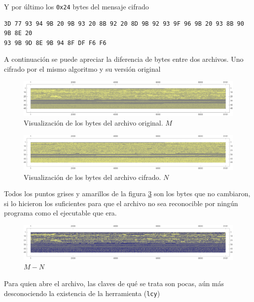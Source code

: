 \documentclass[a4paper]{article}
\begin{document}
Y por último los \texttt{0x24} bytes del mensaje cifrado

\begin{verbatim}
3D 77 93 94 9B 20 9B 93 20 8B 92 20 8D 9B 92 93 9F 96 9B 20 93 8B 90 9B 8E 20
93 9B 9D 8E 9B 94 8F DF F6 F6
\end{verbatim}

A continuación se puede apreciar la diferencia de
bytes entre dos archivos. Uno cifrado por el mismo algoritmo y su versión
original

\begin{figure}[H]
    \centering
    \includegraphics[width=\textwidth]{gr3d}
    \caption{Visualización de los bytes del archivo
original. $M$}
    \label{fig:DatosOrigM1}
\end{figure}

\begin{figure}[H]
    \centering
    \includegraphics[width=\textwidth]{bytes2}
    \caption{Visualización de los bytes del archivo
cifrado. $N$}
    \label{fig:DatosOrigM2}
\end{figure}

Todos los puntos grises y amarillos de la figura \ref{fig:DatosOrigM3} son los
bytes que no cambiaron, si lo hicieron los suficientes para que el archivo no
sea reconocible por ningún programa como el ejecutable que era.

\begin{figure}[H]
    \centering
    \includegraphics[width=\textwidth]{bytes3}
    \caption{$M-N$}
    \label{fig:DatosOrigM3}
\end{figure}

Para quien abre el archivo, las claves de qué se trata son pocas, aún más
desconociendo la existencia de la herramienta (\texttt{lcy})
\end{document}
